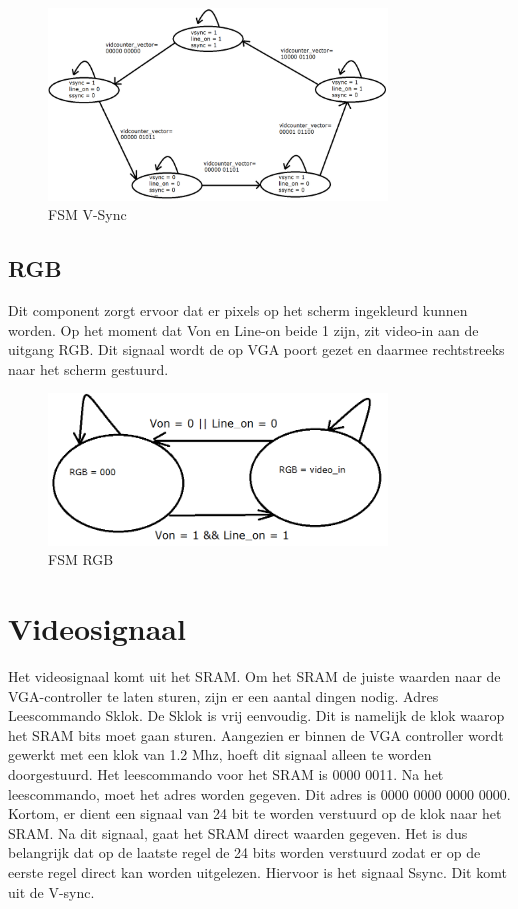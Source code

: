 \documentclass[oneside,dutch]{tudelft-report}
\begin{document}
\begin{figure}[H]
\center
\includegraphics[width=9cm]{FSM-V-sync}
\caption{FSM V-Sync}
\label{VGA}
\end{figure}

\subsection{RGB}
Dit component zorgt ervoor dat er pixels op het scherm ingekleurd kunnen worden. Op het moment dat Von en Line-on beide 1 zijn, zit video-in aan de uitgang RGB. Dit signaal wordt de op VGA poort gezet en daarmee rechtstreeks naar het scherm gestuurd. 

\begin{figure}[H]
\center
\includegraphics[width=9cm]{FSM-rgb}
\caption{FSM RGB}
\label{VGA}
\end{figure}

\section{Videosignaal}
Het videosignaal komt uit het SRAM. Om het SRAM de juiste waarden naar de VGA-controller te laten sturen, zijn er een aantal dingen nodig.
Adres
Leescommando
Sklok.
De Sklok is vrij eenvoudig. Dit is namelijk de klok waarop het SRAM bits moet gaan sturen. Aangezien er binnen de VGA controller wordt gewerkt met een klok van 1.2 Mhz, hoeft dit signaal alleen te worden doorgestuurd. Het leescommando voor het SRAM is 0000 0011. Na het leescommando, moet het adres worden gegeven. Dit adres is 0000 0000 0000 0000. Kortom, er dient een signaal van 24 bit te worden verstuurd op de klok naar het SRAM. Na dit signaal, gaat het SRAM direct waarden gegeven. Het is dus belangrijk dat op de laatste regel de 24 bits worden verstuurd zodat er op de eerste regel direct kan worden uitgelezen. Hiervoor is het signaal Ssync. Dit komt uit de V-sync. 
\end{document}
